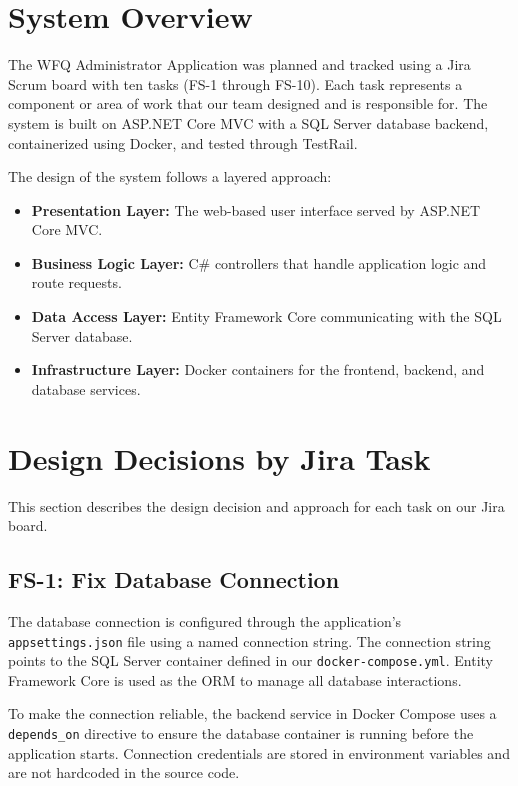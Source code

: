 \documentclass[12pt]{article}
\begin{document}
\section{System Overview}
 
The WFQ Administrator Application was planned and tracked using a Jira Scrum board with ten
tasks (FS-1 through FS-10). Each task represents a component or area of work that our team
designed and is responsible for. The system is built on ASP.NET Core MVC with a SQL Server
database backend, containerized using Docker, and tested through TestRail.
 
The design of the system follows a layered approach:
\begin{itemize}
    \item \textbf{Presentation Layer:} The web-based user interface served by ASP.NET Core MVC.
    \item \textbf{Business Logic Layer:} C\# controllers that handle application logic and
    route requests.
    \item \textbf{Data Access Layer:} Entity Framework Core communicating with the SQL Server
    database.
    \item \textbf{Infrastructure Layer:} Docker containers for the frontend, backend, and
    database services.
\end{itemize}
 
\section{Design Decisions by Jira Task}
 
This section describes the design decision and approach for each task on our Jira board.
 
\subsection{FS-1: Fix Database Connection}
The database connection is configured through the application's \texttt{appsettings.json}
file using a named connection string. The connection string points to the SQL Server
container defined in our \texttt{docker-compose.yml}. Entity Framework Core is used as the
ORM to manage all database interactions.
 
To make the connection reliable, the backend service in Docker Compose uses a
\texttt{depends\_on} directive to ensure the database container is running before the
application starts. Connection credentials are stored in environment variables and are not
hardcoded in the source code.
 
\end{document}
